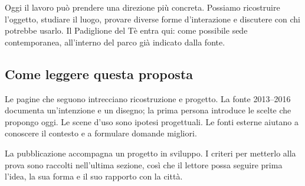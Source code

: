 Oggi il lavoro può prendere una direzione più concreta. Possiamo
ricostruire l'oggetto, studiare il luogo, provare diverse forme
d'interazione e discutere con chi potrebbe usarlo. Il Padiglione
del Tè entra qui: come possibile sede contemporanea, all'interno
del parco già indicato dalla fonte.

\subsection{Come leggere questa proposta}
Le pagine che seguono intrecciano ricostruzione e progetto. La fonte
2013--2016 documenta un'intenzione e un disegno; la prima persona
introduce le scelte che propongo oggi. Le scene d'uso sono ipotesi
progettuali. Le fonti esterne aiutano a conoscere il contesto e a
formulare domande migliori.

La pubblicazione accompagna un progetto in sviluppo. I criteri
per metterlo alla prova sono raccolti nell'ultima sezione, così
che il lettore possa seguire prima l'idea, la sua forma e il suo
rapporto con la città.

